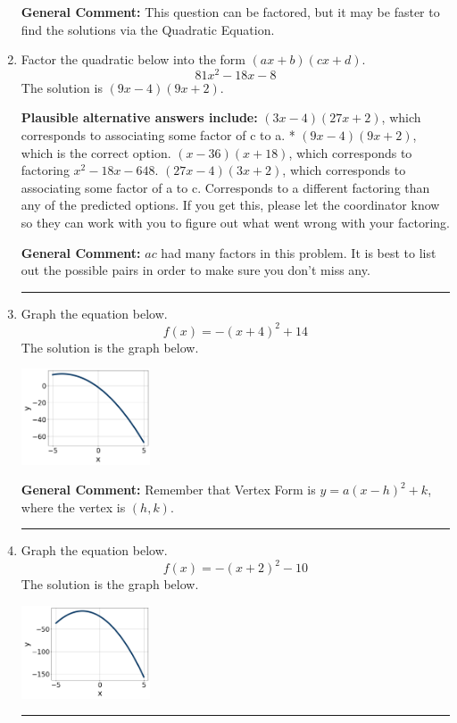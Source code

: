 \documentclass{extbook}[14pt]
\newcommand{\litem}[1]{\item #1

\rule{\textwidth}{0.4pt}}
\begin{document}
\begin{enumerate}
{\textbf{General Comment:} This question can be factored, but it may be faster to find the solutions via the Quadratic Equation.
}
\litem{
Factor the quadratic below into the form $(ax+b)(cx+d)$.
\[ 81x^{2} -18 x -8 \]The solution is \( (9x -4)(9x + 2) \).\begin{enumerate}[label=\Alph*.]
\textbf{Plausible alternative answers include:} $(3x -4)(27x + 2)$, which corresponds to associating some factor of c to a.
* $(9x -4)(9x + 2)$, which is the correct option.
 $(x -36)(x + 18)$, which corresponds to factoring $x^{2} -18 x -648$.
 $(27x -4)(3x + 2)$, which corresponds to associating some factor of a to c.
 Corresponds to a different factoring than any of the predicted options. If you get this, please let the coordinator know so they can work with you to figure out what went wrong with your factoring.
\end{enumerate}

\textbf{General Comment:} $ac$ had many factors in this problem. It is best to list out the possible pairs in order to make sure you don't miss any.
}
\litem{
Graph the equation below.
\[ f(x) = -(x+4)^2 + 14 \]The solution is the graph below.
    \begin{center}
        \includegraphics[width=0.3\textwidth]{../Figures/quadraticEquationToGraphCopyCA.png}
    \end{center}

\textbf{General Comment:} Remember that Vertex Form is $y = a(x-h)^2+k$, where the vertex is $(h, k)$.
}
\litem{
Graph the equation below.
\[ f(x) = -(x+2)^2 - 10 \]The solution is the graph below.
    \begin{center}
        \includegraphics[width=0.3\textwidth]{../Figures/quadraticEquationToGraphCA.png}
    \end{center}

}
\end{enumerate}
\end{document}
